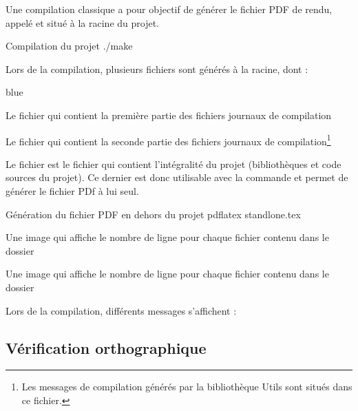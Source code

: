 Une compilation classique a pour objectif de générer le fichier PDF de rendu, appelé  et situé à la racine du projet.
\begin{Bash}{Compilation du projet}
./make
\end{Bash}

Lors de la compilation, plusieurs fichiers sont générés à la racine, dont : 

\begin{items}{blue}{\Triangle}
    \item Le fichier  qui contient la première partie des fichiers journaux de compilation
    \item Le fichier  qui contient la seconde partie des fichiers journaux de compilation\footnote{Les messages de compilation générés par la bibliothèque Utils sont situés dans ce fichier.}
    \item Le fichier  est le fichier qui contient l'intégralité du projet (bibliothèques et code sources du projet). Ce dernier est donc utilisable avec la commande  et permet de générer le fichier PDf à lui seul.

    \begin{Bash}{Génération du fichier PDF en dehors du projet}
        pdflatex standlone.tex
        \end{Bash}

        
    \item Une image  qui affiche le nombre de ligne pour chaque fichier contenu dans le dossier 
    \item Une image  qui affiche le nombre de ligne pour chaque fichier contenu dans le dossier 
\end{items}

Lors de la compilation, différents messages s'affichent : 


\subsection{Vérification orthographique}

